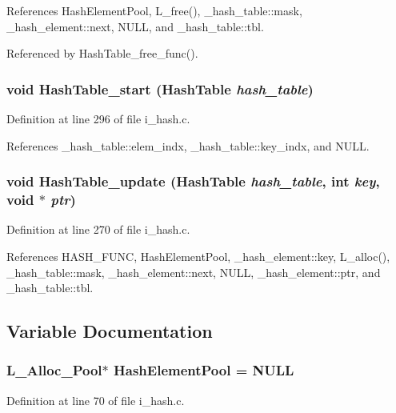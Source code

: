References Hash\-Element\-Pool, L\_\-free(), \_\-hash\_\-table::mask, \_\-hash\_\-element::next, NULL, and \_\-hash\_\-table::tbl.

Referenced by Hash\-Table\_\-free\_\-func().
\subsubsection{\setlength{\rightskip}{0pt plus 5cm}void Hash\-Table\_\-start (\bf{Hash\-Table} {\em hash\_\-table})}\label{i__hash_8c_b5ceafd74e84938d3431eda4274d97f3}




Definition at line 296 of file i\_\-hash.c.

References \_\-hash\_\-table::elem\_\-indx, \_\-hash\_\-table::key\_\-indx, and NULL.
\subsubsection{\setlength{\rightskip}{0pt plus 5cm}void Hash\-Table\_\-update (\bf{Hash\-Table} {\em hash\_\-table}, int {\em key}, void $\ast$ {\em ptr})}\label{i__hash_8c_25f7582db136efb2599666381506437d}




Definition at line 270 of file i\_\-hash.c.

References HASH\_\-FUNC, Hash\-Element\-Pool, \_\-hash\_\-element::key, L\_\-alloc(), \_\-hash\_\-table::mask, \_\-hash\_\-element::next, NULL, \_\-hash\_\-element::ptr, and \_\-hash\_\-table::tbl.

\subsection{Variable Documentation}
\subsubsection{\setlength{\rightskip}{0pt plus 5cm}\bf{L\_\-Alloc\_\-Pool}$\ast$ \bf{Hash\-Element\-Pool} = NULL}\label{i__hash_8c_000917fef40551778dc8b425b32a1d1a}




Definition at line 70 of file i\_\-hash.c.

